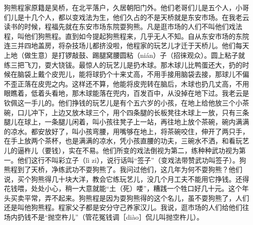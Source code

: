 \documentclass[12pt,UTF8]{ctexbook}
\begin{document}
狗熊程家原籍是吴桥，在北平落户，久居朝阳门外。他们老哥们儿是五个人，小哥们儿是十几个人，都以变戏法为生，他们久占的不是天桥就是东安市场。在我老云读书的时候，程福先就在东安市场东院耍狗熊。凡是逛市场的人们不叫他们戏法程，叫他们狗熊程。直到如今提起狗熊程来，几乎无人不知。自从东安市场的东院连三并四地盖房，将杂技场儿都挤没啦，他程家的玩艺儿才迁于天桥儿。他们每天上地（做生意）是打锣敲鼓、踢腿窝腰圆粘（nián）子（招徕观众）。圆上粘子就练三把飞刀，耍大铙钹。最惊人的玩艺儿是扔木球。那木球儿比鸭蛋还大，扔的时候在脑袋上戴个皮兜儿，能将球扔个十来丈高，不用手接用脑袋去接，那球儿不偏不歪正落在皮兜之内。这样还不算，他能将皮兜转在脑后，木球也扔几丈高，不用眼瞧着，低着头看地，那木球能落在兜内，百发百中，从没掉在地下过。我老云是钦佩这一手儿的。他们挣钱的玩艺儿是有个五六岁的小孩，在地上给他放三个小茶碗，口儿冲下，上边又放木球三个，用个四条腿的长板凳往木球上一放，只有三条腿儿在球上，一条腿儿闲着，叫小孩往凳子上一站，再往地上放个茶碗，碗内满满的凉水。都安放好了，叫小孩弯腰，用嘴够在地上，将茶碗咬住，伸开了两只手，在手上放两个茶杯，也是满满的凉水，凭小孩直腰的功夫，三碗水不洒，和看玩艺儿的逼杵儿（要钱），实在不易。他们所变的戏法倒视为第二，练种种武功视为第一。他们这行不叫彩立子（lì zi），说行话叫“签子”（变戏法带赞武功叫签子）。狗熊程到了天桥，净练武功不耍狗熊了。我问过他们，这几年为何不耍狗熊？他们说，买个狗熊得几十块大洋，教会它练玩艺儿，没几个月工夫不能用它挣钱。还得花钱喂，处处小心，稍一大意就能“土（死）喽”，糟践一个牲口好几十元。这个年头买卖平常，弄不起来。狗熊程是因为耍狗熊得的这个名儿，虽不耍狗熊了，人们还是叫他狗熊程。程家父子都是安分守己养家汉儿。我说，逛市场的人们给他们往场内扔钱不是“抛空杵儿”（管花冤钱调［diào］侃儿叫抛空杵儿）。
\end{document}
